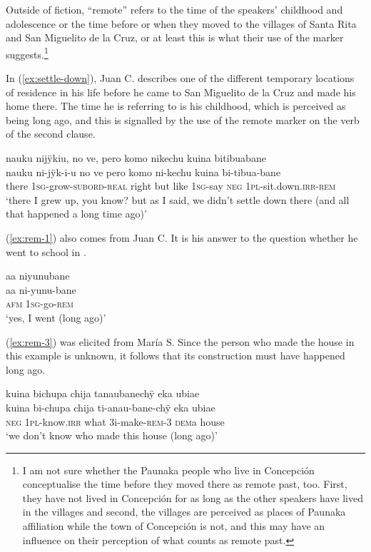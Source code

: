 Outside of fiction, “remote” refers to the time of the speakers’ childhood and adolescence or the time before or when they moved to the villages of Santa Rita and San Miguelito de la Cruz, or at least this is what their use of the marker suggests.\footnote{I am not sure whether the Paunaka people who live in Concepción conceptualise the time before they moved there as remote past, too. First, they have not lived in Concepción for as long as the other speakers have lived in the villages and second, the villages are perceived as places of Paunaka affiliation while the town of Concepción is not, and this may have an influence on their perception of what counts as remote past.} 

In (\ref{ex:settle-down}), Juan C. describes one of the different temporary locations of residence in his life before he came to San Miguelito de la Cruz and made his home there. The time he is referring to is his childhood, which is perceived as being long ago, and this is signalled by the use of the remote marker on the verb of the second clause.

\ea\label{ex:settle-down}
\begingl 
\glpreamble nauku nijÿkiu, no ve, pero komo nikechu kuina bitibuabane\\
\gla nauku ni-jÿk-i-u {no ve} pero komo ni-kechu kuina bi-tibua-bane\\ 
\glb there 1\textsc{sg}-grow-\textsc{subord}-\textsc{real} {right} but like 1\textsc{sg}-say \textsc{neg} 1\textsc{pl}-sit.down.\textsc{irr}-\textsc{rem}\\ 
\glft ‘there I grew up, you know? but as I said, we didn’t settle down there (and all that happened a long time ago)’
\trailingcitation{[mqx-p110826l.438]}
\xe

(\ref{ex:rem-1}) also comes from Juan C. It is his answer to the question whether he went to school in .

\ea\label{ex:rem-1}
\begingl
\glpreamble aa niyunubane\\
\gla aa ni-yunu-bane\\
\glb \textsc{afm} 1\textsc{sg}-go-\textsc{rem}\\
\glft ‘yes, I went (long ago)’
\endgl
\trailingcitation{[mqx-p110826l.213]}
\xe

(\ref{ex:rem-3}) was elicited from María S. Since the person who made the house in this example is unknown, it follows that its construction must have happened long ago.

\ea\label{ex:rem-3}
\begingl
\glpreamble kuina bichupa chija tanaubanechÿ eka ubiae\\
\gla kuina bi-chupa chija ti-anau-bane-chÿ eka ubiae\\
\glb \textsc{neg} 1\textsc{pl}-know.\textsc{irr} what 3i-make-\textsc{rem}-3 \textsc{dem}a house\\
\glft ‘we don’t know who made this house (long ago)’
\endgl
\trailingcitation{[rxx-e201231f.38]}
\xe

